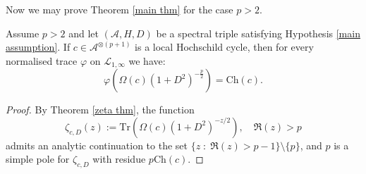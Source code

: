     Now we may prove Theorem \ref{main thm} for the case $p > 2$.
    \begin{thm*}
        Assume $p > 2$ and let $(\mathcal{A},H,D)$ be a spectral triple satisfying Hypothesis \ref{main assumption}. If $c\in\mathcal{A}^{\otimes (p+1)}$ is a local Hochschild cycle, then
        for every normalised trace $\varphi$ on $\mathcal{L}_{1,\infty}$ we have:
        \begin{equation*}
            \varphi(\Omega(c)(1+D^2)^{-\frac{p}{2}})=\mathrm{Ch}(c).
        \end{equation*}
    \end{thm*}
    \begin{proof}
        By Theorem \ref{zeta thm}, the function
        \begin{equation*}
            \zeta_{c,D}(z) := \mathrm{Tr}(\Omega(c)(1+D^2)^{-z/2}),\quad \Re(z) > p
        \end{equation*}
        admits an analytic continuation to the set $\{z\;:\;\Re(z) > p-1\}\setminus \{p\}$, and $p$ is a simple pole for $\zeta_{c,D}$
        with residue $p\mathrm{Ch}(c)$.


\end{proof}
